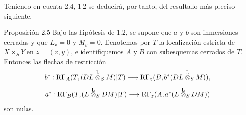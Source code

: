Teniendo en cuenta 2.4, 1.2 se deducirá, por tanto, del resultado más preciso siguiente.

\begin{statement}{Proposición 2.5}
Bajo las hipótesis de 1.2, se supone que $a$ y $b$ son inmersiones cerradas y que $L_x=0$ y $M_y=0$. Denotemos por $T$ la localización estricta de $X\times_SY$ en $z=(x,y)$, e identifiquemos $A$ y $B$ con subesquemas cerrados de $T$. Entonces las flechas de restricción
\[
b^*:\mathrm{R}\Gamma_A(T,(DL\overset{\mathrm L}{\otimes}_SM)|T)
 \longrightarrow \mathrm{R}\Gamma_z(B,b^*(DL\overset{\mathrm L}{\otimes}_SM)),
\]
\[
a^*:\mathrm{R}\Gamma_B(T,(L\overset{\mathrm L}{\otimes}_SDM)|T)
 \longrightarrow \mathrm{R}\Gamma_z(A,a^*(L\overset{\mathrm L}{\otimes}_SDM))
\]
son nulas.
\end{statement}
